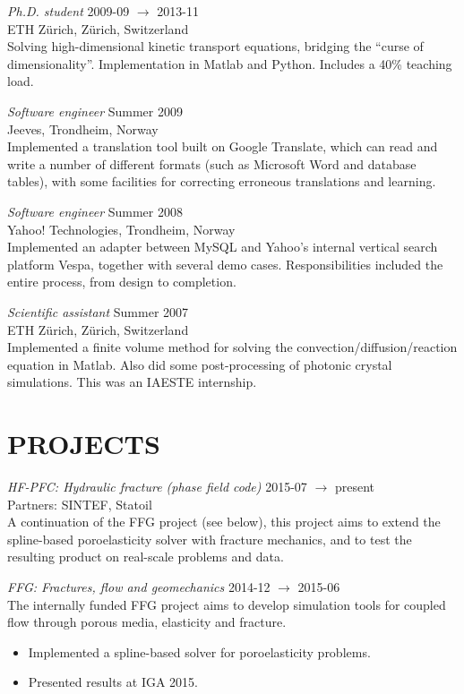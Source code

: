 \documentclass[line,margin]{res}
\newcommand{\zh}{Z\"{u}rich}
\begin{document}
\begin{resume}
{\em Ph.D. student} \hfill 2009-09 $\to$ 2013-11 \\
ETH \zh, \zh, Switzerland \\
Solving high-dimensional kinetic transport equations, bridging the ``curse of dimensionality''.
Implementation in Matlab and Python. Includes a 40\% teaching load.

{\em Software engineer} \hfill Summer 2009 \\
Jeeves, Trondheim, Norway \\
Implemented a translation tool built on Google Translate, which can read and write a number of
different formats (such as Microsoft Word and database tables), with some facilities for correcting
erroneous translations and learning.

{\em Software engineer} \hfill Summer 2008 \\
Yahoo! Technologies, Trondheim, Norway \\
Implemented an adapter between MySQL and Yahoo's internal vertical search platform Vespa, together
with several demo cases. Responsibilities included the entire process, from design to completion.

{\em Scientific assistant} \hfill Summer 2007 \\
ETH \zh, \zh, Switzerland \\
Implemented a finite volume method for solving the convection/diffusion/reaction equation in
Matlab. Also did some post-processing of photonic crystal simulations. This was an IAESTE
internship.


\section{PROJECTS}

{\em HF-PFC: Hydraulic fracture (phase field code)}
\hfill 2015-07 $\to$ present \\
{\small Partners: SINTEF, Statoil} \\
A continuation of the FFG project (see below), this project aims to extend the
spline-based poroelasticity solver with fracture mechanics, and to test the
resulting product on real-scale problems and data.

\newpage

{\em FFG: Fractures, flow and geomechanics} \hfill 2014-12 $\to$ 2015-06 \\
The internally funded FFG project aims to develop simulation tools for coupled
flow through porous media, elasticity and fracture.
\begin{itemize}
\item Implemented a spline-based solver for poroelasticity problems.
\item Presented results at  IGA 2015.
\end{itemize}


\end{resume}
\end{document}
